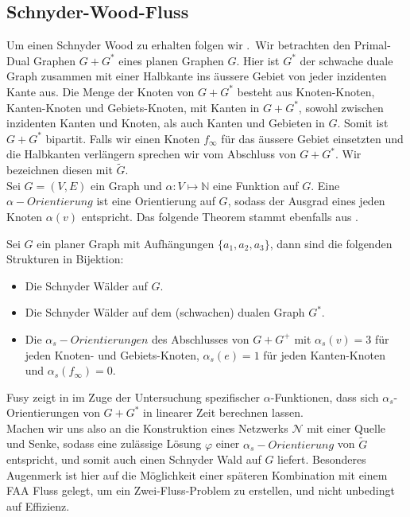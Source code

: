 \subsection{Schnyder-Wood-Fluss}

Um einen Schnyder Wood zu erhalten folgen wir \cite{felsner04lattice}.\
Wir betrachten den Primal-Dual Graphen $G+G^*$ eines planen Graphen $G$. Hier ist $G^*$ der schwache duale Graph zusammen mit einer Halbkante ins äussere Gebiet von jeder inzidenten Kante aus. Die Menge der Knoten von $G+G^*$ besteht aus Knoten-Knoten, Kanten-Knoten und Gebiets-Knoten, mit Kanten in $G+G^*$, sowohl zwischen inzidenten Kanten und Knoten, als auch Kanten und Gebieten in $G$. Somit ist $G+G^*$ bipartit. Falls wir einen Knoten $f_\infty$ für das äussere Gebiet einsetzten und die Halbkanten verlängern sprechen wir vom Abschluss von $G+G^*$. Wir bezeichnen diesen mit $\tilde{G}$.\\
Sei $G=(V,E)$ ein Graph und $\alpha:V\mapsto\mathbb{N}$ eine Funktion auf $G$. Eine $\alpha-Orientierung$ ist eine Orientierung auf $G$, sodass der Ausgrad eines jeden Knoten $\alpha(v)$ entspricht. Das folgende Theorem stammt ebenfalls aus \cite{felsner04lattice}.

\begin{theorem}
Sei $G$ ein planer Graph mit Aufhängungen $\{a_1,a_2,a_3\}$, dann sind die folgenden Strukturen in Bijektion:
\begin{itemize}
\item Die Schnyder Wälder auf $G$.
\item Die Schnyder Wälder auf dem (schwachen) dualen Graph $G^*$.
\item Die $\alpha_{s}-Orientierungen$ des Abschlusses von $G+G^+$ mit $\alpha_s(v) = 3$ für jeden Knoten- und Gebiets-Knoten,  $\alpha_s(e) = 1$ für jeden Kanten-Knoten und  $\alpha_s(f_\infty) = 0$.
\end{itemize}
\end{theorem}

Fusy zeigt in \cite{fusy07} im Zuge der Untersuchung spezifischer $\alpha$-Funktionen, dass sich $\alpha_s$-Orientierungen von $G+G^*$ in linearer Zeit berechnen lassen.\\

Machen wir uns also an die Konstruktion eines Netzwerks $\mathcal{N}$ mit einer Quelle und Senke, sodass eine zulässige Lösung $\varphi$ einer $\alpha_s-Orientierung$ von $\tilde{G}$ entspricht, und somit auch einen Schnyder Wald auf $G$ liefert. Besonderes Augenmerk ist hier auf die Möglichkeit einer späteren Kombination mit einem FAA Fluss gelegt, um ein Zwei-Fluss-Problem zu erstellen, und nicht unbedingt auf Effizienz.\

